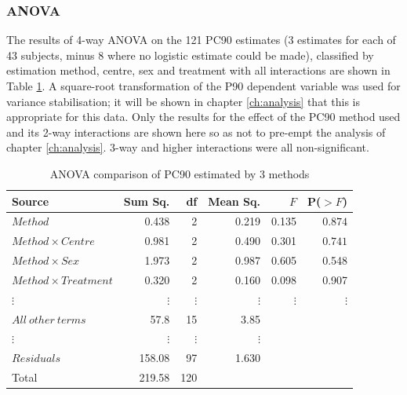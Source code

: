 \subsubsection*{ANOVA}
The results of 4-way ANOVA on the 121 PC90 estimates (3 estimates for each of 43 subjects, minus 8 where no logistic estimate could be made), classified by estimation method, centre, sex and treatment with all interactions are shown in Table \ref{pc90aov}. A square-root transformation of the P90 dependent variable was used for variance stabilisation; it will be shown in chapter \ref{ch:analysis} that this is appropriate for this data. Only the results for the effect of the PC90 method used and its 2-way interactions are shown here so as not to pre-empt the analysis of chapter \ref{ch:analysis}. 3-way and higher interactions were all non-significant.
\begin{table}[h]
\centering
\caption{ANOVA comparison of PC90 estimated by 3 methods}\label{pc90aov}
\begin{tabular}{l|rrrrr}
Source&Sum Sq.&df&Mean Sq.&$F$&P($>F$)\\
\hline
$Method$&0.438&2&0.219&0.135&$0.874$\\
$Method\times Centre$&0.981&2&0.490&0.301&$0.741$\\
$Method\times Sex$&1.973&2&0.987&0.605&0.548\\
$Method\times Treatment$&0.320&2&0.160&0.098&0.907\\
$\vdots$&$\vdots$&$\vdots$&$\vdots$&$\vdots$&$\vdots$\\
$All\ other\ terms$&57.8&15&3.85&&\\
$\vdots$&$\vdots$&$\vdots$&$\vdots$&&\\
$Residuals$&158.08&97&1.630&&\\
\hline
Total&219.58&120&&&
\end{tabular}
\end{table}

